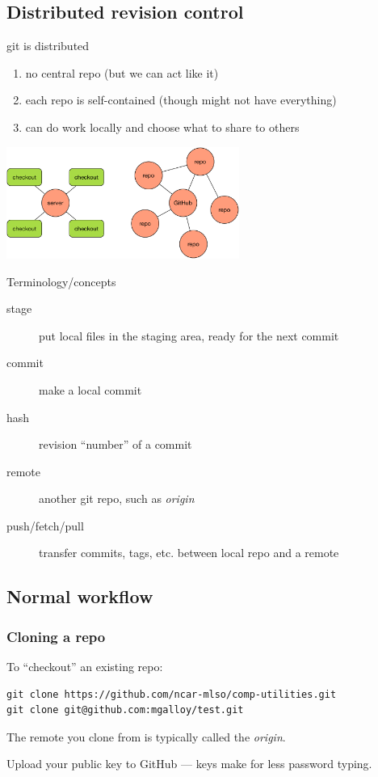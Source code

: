 \documentclass{beamer}
\begin{document}
\subsection{Distributed revision control}
\begin{frame}{git is distributed}
  \begin{enumerate}
    \item no central repo (but we can act like it)
    \item each repo is self-contained (though might not have everything)
    \item can do work locally and choose what to share to others
  \end{enumerate}
  \begin{center}
    \includegraphics[width=3in]{drc.pdf}
  \end{center}
\end{frame}

\begin{frame}{Terminology/concepts}
  \begin{description}
    \item[stage] put local files in the staging area, ready for the next commit
    \item[commit] make a local commit
    \item[hash] revision ``number'' of a commit
    \item[remote] another git repo, such as {\em origin}
    \item[push/fetch/pull] transfer commits, tags, etc. between local repo and a remote
  \end{description}
\end{frame}

\subsection{Normal workflow}
\begin{frame}[fragile]
  \frametitle{Cloning a repo}
To ``checkout'' an existing repo:
  \begin{small}
  \begin{lstlisting}
git clone https://github.com/ncar-mlso/comp-utilities.git
git clone git@github.com:mgalloy/test.git
  \end{lstlisting}
  \end{small}
The remote you clone from is typically called the {\em origin}.

\vspace{1em}

Upload your public key to GitHub --- keys make for less password typing. 
\end{frame}
\end{document}
